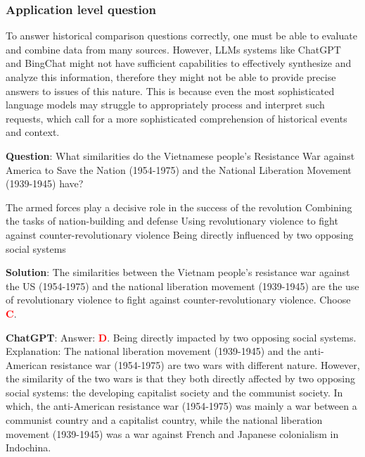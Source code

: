 \documentclass{article}
\begin{document}
{\begin{mdframed}[linewidth=1pt,linecolor=red]
	\end{mdframed}
	
	\subsubsection{Application level question}
	\label{VNHSGE_His_A}
	
	To answer historical comparison questions correctly, one must be able to evaluate and combine data from many sources. However, LLMs systems like ChatGPT and BingChat might not have sufficient capabilities to effectively synthesize and analyze this information, therefore they might not be able to provide precise answers to issues of this nature. This is because even the most sophisticated language models may struggle to appropriately process and interpret such requests, which call for a more sophisticated comprehension of historical events and context.
	
	
	
	\begin{mdframed}[linewidth=1pt,linecolor=red] \textbf{Question}: What similarities do the Vietnamese people's Resistance War against America to Save the Nation (1954-1975) and the National Liberation Movement (1939-1945) have? 
		
		\begin{choices}
			\choice The armed forces play a decisive role in the success of the revolution
			\choice Combining the tasks of nation-building and defense
			\choice Using revolutionary violence to fight against counter-revolutionary violence
			\choice Being directly influenced by two opposing social systems
		\end{choices}
		
		\textbf{Solution}: The similarities between the Vietnam people's resistance war against the US (1954-1975) and the national liberation movement (1939-1945) are the use of revolutionary violence to fight against counter-revolutionary violence. Choose \textcolor{red}{\textbf{C}}.
		
		\textbf{ChatGPT}: Answer: \textcolor{red}{\textbf{D}}. Being directly impacted by two opposing social systems. Explanation: The national liberation movement (1939-1945) and the anti-American resistance war (1954-1975) are two wars with different nature. However, the similarity of the two wars is that they both directly affected by two opposing social systems: the developing capitalist society and the communist society. In which, the anti-American resistance war (1954-1975) was mainly a war between a communist country and a capitalist country, while the national liberation movement (1939-1945) was a war against French and Japanese colonialism in Indochina.  
		

\end{mdframed}}
\end{document}
